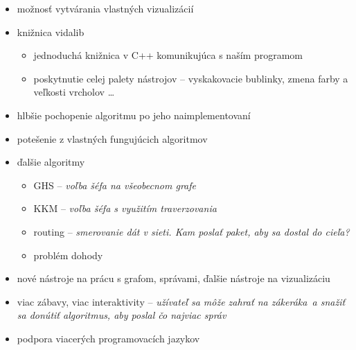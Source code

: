 
\begin{itemize}
    \item možnosť vytvárania vlastných vizualizácií
    \item knižnica vidalib
        \begin{itemize}
            \item jednoduchá knižnica v C++ komunikujúca s naším programom
            \item poskytnutie celej palety nástrojov -- vyskakovacie bublinky, zmena farby a
            veľkosti vrcholov \dots
        \end{itemize}
    \item hlbšie pochopenie algoritmu po jeho naimplementovaní
    \item potešenie z vlastných fungujúcich algoritmov
\end{itemize}




\begin{itemize}
    \item ďalšie algoritmy
    \begin{itemize}
        \item GHS -- \emph{voľba šéfa na všeobecnom grafe}
        \item KKM -- \emph{voľba šéfa s využitím traverzovania}
        \item routing -- \emph{smerovanie dát v sieti. Kam poslať paket, aby sa dostal do cieľa?}
        \item problém dohody
    \end{itemize}
    \item nové nástroje na prácu s grafom, správami, ďalšie nástroje na vizualizáciu
    \item viac zábavy, viac interaktivity -- \emph{užívateľ sa môže zahrať na \clqq zá\-ke\-rá\-ka\crqq\ a snažiť sa
    donútiť algoritmus, aby poslal čo najviac správ}
    \item podpora viacerých programovacích jazykov
\end{itemize}

